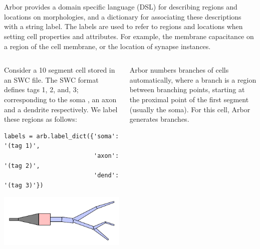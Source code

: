 \documentclass{beamer}
\newcommand*\circled[1]{\tikz[baseline=(char.base)]{\node[shape=circle,fill,inner sep=2pt] (char) {\textcolor{white}{#1}};}} %
\begin{document}
\begin{frame}[t, fragile]
  \textbf{{\large{}}}\\
  \textbf{}\\
  Arbor provides a domain specific language (DSL) for describing regions and locations on morphologies, and a dictionary for associating these descriptions with a string label. The labels are used to refer to regions and locations when setting cell properties and attributes. For example, the membrane capacitance on a region of the cell membrane, or the location of synapse instances.\\[-0.5ex]
  \begin{columns}[onlytextwidth,T]
    \begin{column}{0.33\textwidth}
      \circled{1} Consider a 10 segment cell stored in an SWC file. The SWC
      format defines tags 1, 2, and, 3; corresponding to the soma
      , an axon
       and a
      dendrite  respectively. We label these regions as follows: \vspace*{-1ex}
\begin{verbatim}
labels = arb.label_dict({'soma': '(tag 1)',
                         'axon': '(tag 2)',
                         'dend': '(tag 3)'})
\end{verbatim}
      \vspace*{-4ex}
      \begin{center}\includegraphics[width=0.8\linewidth]{scripts/morph.pdf}\end{center}
    \end{column}
    \begin{column}{0.33\textwidth}
      \circled{2} Arbor numbers branches of cells automatically, where a branch
      is a region between branching points, starting at the proximal point
      {\color{red}\circled{\phantom{-}}} of the first segment (usually the soma). For this
      cell, Arbor generates {\color{mediumslateblue}\circled{6}} branches.

\end{column}
\end{columns}
\end{frame}
\end{document}
